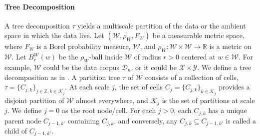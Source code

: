 \documentclass{article} %
\newcommand{\Real}{\mathbb{R}}
\providecommand{\mc}[1]{\mathcal{#1}}
\newcommand{\from}{{\ensuremath{\colon}}}  %
\newcommand{\ZZ}{\mathbb{Z}}
\newtheorem{definition}[theorem]{Definition}
\begin{document}
\paragraph{Tree Decomposition}
A tree decomposition $\tau$ yields a multiscale partition of the data or the ambient space in which the data live.
Let $(\mc{W},\rho_W, F_W)$ be a measurable metric space, where $F_W$ is a Borel probability measure, $\mc{W}$, and $\rho_W \from \mc{W} \times \mc{W} \to \Real$ is a metric on $\mc{W}$.  Let $B_r^{\mc{W}}(w)$ be the $\rho_W$-ball inside $\mc{W}$ of radius $r > 0$ centered at $w \in \mc{W}$. For example, $\mc{W}$ could be the data corpus $\mc{D}_n$, or it could be $\mc{X} \times \mc{Y}$. We define a tree decomposition as in \cite{Allard2012,ChenMaggioni12}.  A partition tree $\tau$ of $\mc{W}$ consists of a collection of cells, $\tau=\{C_{j,k}\}_{j \in \ZZ, k \in \mc{K}_j}$.  At each scale $j$, the set of cells $C_j=\{C_{j,k}\}_{k \in \mc{K}_j}$ provides a disjoint partition of $\mc{W}$ almost everywhere, and $\mc{K}_j$ is the set of partitions at scale $j$.  We define $j=0$ as the root node/cell.  For each $j > 0$,  each $C_{j,k}$ has a unique parent node $C_{j-1,k'}$ containing $C_{j,k}$, and conversely, any $C_{j,k} \subseteq C_{j-1,k'}$ is called a child of $C_{j-1,k'}$.


\end{document}
